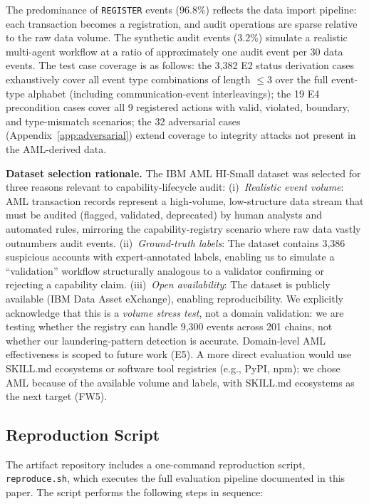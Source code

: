 The predominance of \texttt{REGISTER} events (96.8\%) reflects the data import pipeline: each transaction becomes a registration, and audit operations are sparse relative to the raw data volume. The synthetic audit events (3.2\%) simulate a realistic multi-agent workflow at a ratio of approximately one audit event per 30 data events. The test case coverage is as follows: the 3,382 E2 status derivation cases exhaustively cover all event type combinations of length $\leq 3$ over the full event-type alphabet (including communication-event interleavings); the 19 E4 precondition cases cover all 9 registered actions with valid, violated, boundary, and type-mismatch scenarios; the 32 adversarial cases (Appendix~\ref{app:adversarial}) extend coverage to integrity attacks not present in the AML-derived data.

\textbf{Dataset selection rationale.} The IBM AML HI-Small dataset was selected for three reasons relevant to capability-lifecycle audit: (i)~\emph{Realistic event volume}: AML transaction records represent a high-volume, low-structure data stream that must be audited (flagged, validated, deprecated) by human analysts and automated rules, mirroring the capability-registry scenario where raw data vastly outnumbers audit events. (ii)~\emph{Ground-truth labels}: The dataset contains 3,386 suspicious accounts with expert-annotated labels, enabling us to simulate a ``validation'' workflow structurally analogous to a validator confirming or rejecting a capability claim. (iii)~\emph{Open availability}: The dataset is publicly available (IBM Data Asset eXchange), enabling reproducibility. We explicitly acknowledge that this is a \emph{volume stress test}, not a domain validation: we are testing whether the registry can handle 9,300 events across 201 chains, not whether our laundering-pattern detection is accurate. Domain-level AML effectiveness is scoped to future work (E5). A more direct evaluation would use SKILL.md ecosystems or software tool registries (e.g., PyPI, npm); we chose AML because of the available volume and labels, with SKILL.md ecosystems as the next target (FW5).

\subsection{Reproduction Script}

The artifact repository includes a one-command reproduction script, \texttt{reproduce.sh}, which executes the full evaluation pipeline documented in this paper. The script performs the following steps in sequence:

